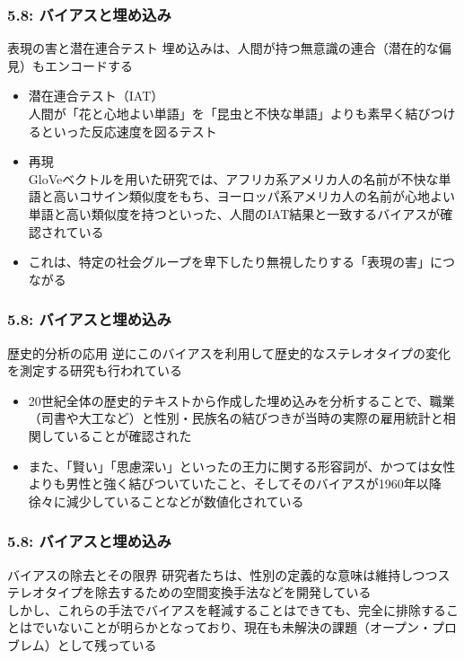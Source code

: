 \documentclass[unicode,11pt]{beamer} %
\begin{document}
\begin{frame}
    \frametitle{5.8: バイアスと埋め込み}
    \begin{alertblock}{表現の害と潜在連合テスト}
        埋め込みは、人間が持つ無意識の連合（潜在的な偏見）もエンコードする
        \begin{itemize}
            \item 潜在連合テスト（IAT）\\人間が「花と心地よい単語」を「昆虫と不快な単語」よりも素早く結びつけるといった反応速度を図るテスト
            \item 再現\\GloVeベクトルを用いた研究では、アフリカ系アメリカ人の名前が不快な単語と高いコサイン類似度をもち、ヨーロッパ系アメリカ人の名前が心地よい単語と高い類似度を持つといった、人間のIAT結果と一致するバイアスが確認されている
            \item これは、特定の社会グループを卑下したり無視したりする「表現の害」につながる
        \end{itemize}
    \end{alertblock}
\end{frame}

\begin{frame}
    \frametitle{5.8: バイアスと埋め込み}
    \begin{alertblock}{歴史的分析の応用}
        逆にこのバイアスを利用して歴史的なステレオタイプの変化を測定する研究も行われている
        \begin{itemize}
            \item 20世紀全体の歴史的テキストから作成した埋め込みを分析することで、職業（司書や大工など）と性別・民族名の結びつきが当時の実際の雇用統計と相関していることが確認された
            \item また、「賢い」「思慮深い」といったの王力に関する形容詞が、かつては女性よりも男性と強く結びついていたこと、そしてそのバイアスが1960年以降徐々に減少していることなどが数値化されている
        \end{itemize}
    \end{alertblock}
\end{frame}

\begin{frame}
    \frametitle{5.8: バイアスと埋め込み}
    \begin{alertblock}{バイアスの除去とその限界}
        研究者たちは、性別の定義的な意味は維持しつつステレオタイプを除去するための空間変換手法などを開発している
        \\しかし、これらの手法でバイアスを軽減することはできても、完全に排除することはでいないことが明らかとなっており、現在も未解決の課題（オープン・プロブレム）として残っている
    \end{alertblock}
\end{frame}
\end{document}
